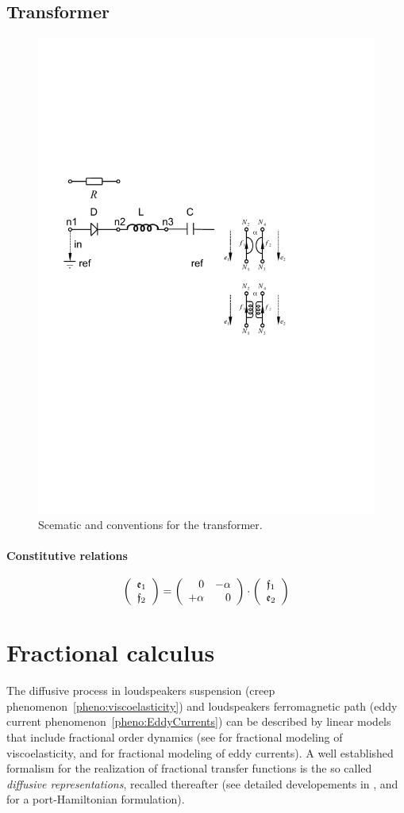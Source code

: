 \documentclass[10pt,a4paper]{article}
\begin{document}
\subsection{Transformer}
\begin{figure}
\centering
\includegraphics[width=0.3\linewidth]{figures/transformater_scematic.pdf} 
\caption{Scematic and conventions for the transformer.}
\end{figure}
%
\paragraph{Constitutive relations}
$$
\left(
\begin{array}{c}
\mathfrak{e}_1\\
\mathfrak{f}_2
\end{array}
\right)
=
\left(
\begin{array}{rr}
0 & -\alpha \\
+ \alpha  & 0
\end{array}
\right)
\cdot
\left(
\begin{array}{c}
\mathfrak{f}_1\\
\mathfrak{e}_2
\end{array}
\right)
$$
%
\section{Fractional calculus}
\label{sec:fractional_calculus}
%
The diffusive process in loudspeakers suspension (creep phenomenon~\ref{pheno:viscoelasticity}) and loudspeakers ferromagnetic path (eddy current phenomenon~\ref{pheno:EddyCurrents}) can be described by linear models that include fractional order dynamics (see \cite{koeller1984applications, lewandowski2010identification, hu2011modal, Holm2013621} for fractional modeling of viscoelasticity, and \cite{schafer2008modelling, laudebat2003modelisation, rumeau2009modelisation} for fractional modeling of eddy currents).
%
A well established formalism for the realization of fractional transfer functions is the so called \emph{diffusive representations}, recalled thereafter (see detailed developements in \cite{helie2006representations,helie2006diffusive}, and \cite{le2012diffusive} for a port-Hamiltonian formulation).
%
%
%
%
%
%
%
%
%
%
%
%
%
%
%
%
%
%
%
%
%
%
\end{document}
